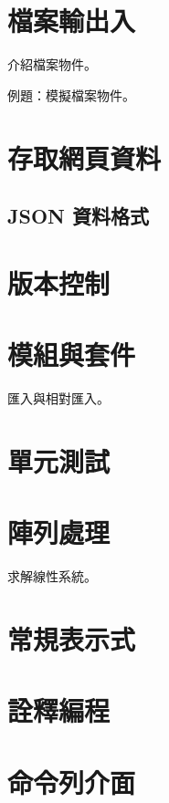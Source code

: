 \documentclass[a4paper,12pt]{book}
\theoremstyle{definition}
\begin{document}
\chapter{檔案輸出入}
%
\label{c:file}

介紹檔案物件。

例題：模擬檔案物件。

\chapter{存取網頁資料}
%
\label{c:web}

\section{JSON 資料格式}

\chapter{版本控制}
%
\label{c:version}

\chapter{模組與套件}
%
\label{c:module}

匯入與相對匯入。

\chapter{單元測試}
%
\label{c:unittest}

\chapter{陣列處理}
%
\label{c:array}

求解線性系統。

\chapter{常規表示式}
%
\label{c:regexp}

\chapter{詮釋編程}
%
\label{c:meta}

\chapter{命令列介面}
%
\label{c:cmdline}
\end{document}

